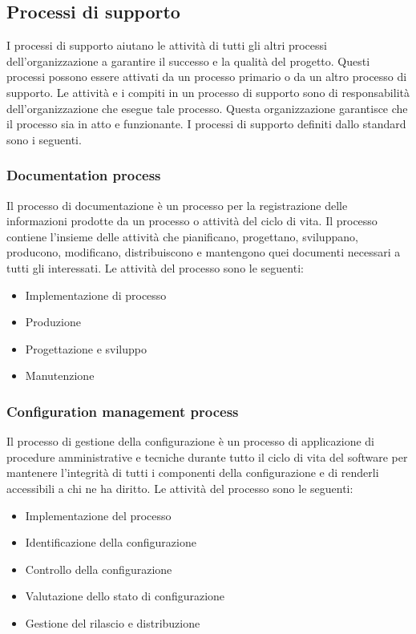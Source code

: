 \subsection{Processi di supporto}
I processi di supporto aiutano le attività di tutti gli altri processi dell'organizzazione a garantire il successo e la qualità del progetto. Questi processi possono essere attivati da un processo primario o da un altro processo di supporto.
Le attività e i compiti in un processo di supporto sono di responsabilità dell'organizzazione che esegue tale processo. Questa organizzazione garantisce che il processo sia in atto e funzionante.
I processi di supporto definiti dallo standard sono i seguenti.
\subsubsection{Documentation process}
Il processo di documentazione è un processo per la registrazione delle informazioni prodotte da un processo o attività del ciclo di vita. Il processo contiene l'insieme delle attività che pianificano, progettano, sviluppano, producono, modificano, distribuiscono e mantengono quei documenti necessari a tutti gli interessati.
Le attività del processo sono le seguenti:
\begin{itemize}
\item Implementazione di processo
\item Produzione
\item Progettazione e sviluppo
\item Manutenzione
\end{itemize}
\subsubsection{Configuration management process}
Il processo di gestione della configurazione è un processo di applicazione di procedure amministrative e tecniche durante tutto il ciclo di vita del software per mantenere l'integrità di tutti i componenti della configurazione e di renderli accessibili a chi ne ha diritto.
Le attività del processo sono le seguenti:
\begin{itemize}
\item Implementazione del processo
\item Identificazione della configurazione
\item Controllo della configurazione
\item Valutazione dello stato di configurazione
\item Gestione del rilascio e distribuzione
\end{itemize}
